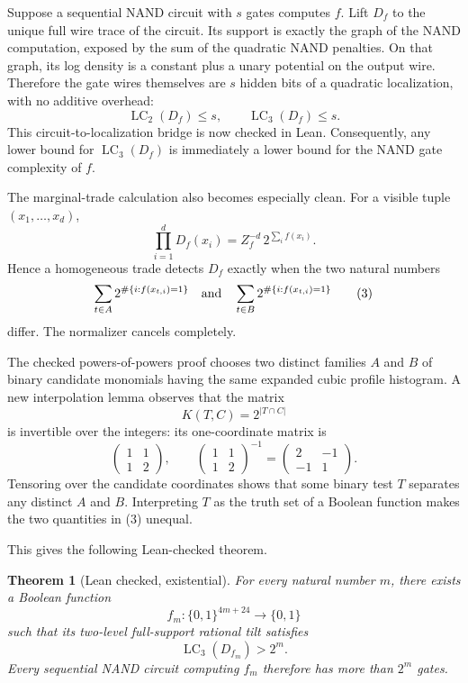 \documentclass[11pt]{article}
\newcommand{\bits}{\{0,1\}}
\newcommand{\LC}{\operatorname{LC}}
\newtheorem{theorem}{Theorem}
\begin{document}
Suppose a sequential NAND circuit with $s$ gates computes $f$.  Lift $D_f$ to
the unique full wire trace of the circuit.  Its support is exactly the graph
of the NAND computation, exposed by the sum of the quadratic NAND penalties.
On that graph, its log density is a constant plus a unary potential on the
output wire.  Therefore the gate wires themselves are $s$ hidden bits of a
quadratic localization, with no additive overhead:
\[
  \LC_2(D_f)\le s,
  \qquad
  \LC_3(D_f)\le s.                         \tag{2}
\]
This circuit-to-localization bridge is now checked in Lean.  Consequently,
any lower bound for $\LC_3(D_f)$ is immediately a lower bound for the NAND
gate complexity of $f$.

The marginal-trade calculation also becomes especially clean.  For a visible
tuple $(x_1,\ldots,x_d)$,
\[
  \prod_{i=1}^d D_f(x_i)
  =Z_f^{-d}\,2^{\sum_i f(x_i)}.
\]
Hence a homogeneous trade detects $D_f$ exactly when the two natural numbers
\[
  \sum_{t\in A}2^{\#\{i:f(x_{t,i})=1\}}
  \quad\hbox{and}\quad
  \sum_{t\in B}2^{\#\{i:f(x_{t,i})=1\}}
                                                        \tag{3}
\]
differ.  The normalizer cancels completely.

The checked powers-of-powers proof chooses two distinct families $A$ and $B$
of binary candidate monomials having the same expanded cubic profile
histogram.  A new interpolation lemma observes that the matrix
\[
  K(T,C)=2^{|T\cap C|}
\]
is invertible over the integers: its one-coordinate matrix is
\[
  \begin{pmatrix}1&1\\1&2\end{pmatrix},
  \qquad
  \begin{pmatrix}1&1\\1&2\end{pmatrix}^{-1}
  =\begin{pmatrix}2&-1\\-1&1\end{pmatrix}.
\]
Tensoring over the candidate coordinates shows that some binary test $T$
separates any distinct $A$ and $B$.  Interpreting $T$ as the truth set of a
Boolean function makes the two quantities in (3) unequal.

This gives the following Lean-checked theorem.

\begin{theorem}[Lean checked, existential]
For every natural number $m$, there exists a Boolean function
\[
  f_m:\bits^{4m+24}\longrightarrow\bits
\]
such that its two-level full-support rational tilt satisfies
\[
  \LC_3(D_{f_m})>2^m.
\]
Every sequential NAND circuit computing $f_m$ therefore has more than $2^m$
gates.
\end{theorem}
\end{document}

